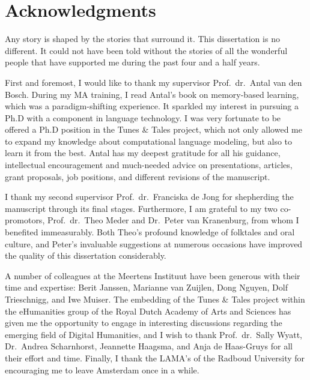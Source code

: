 
\chapter*{Acknowledgments}
  

\noindent Any story is shaped by the stories that surround it. This dissertation is no different. It could not have been told without the stories of all the wonderful people that have supported me during the past four and a half years. 

First and foremost, I would like to thank my supervisor Prof.\ dr.\ Antal van den Bosch. During my MA training, I read Antal's book on memory-based learning, which was a paradigm-shifting experience. It sparkled my interest in pursuing a Ph.D with a component in language technology. I was very fortunate to be offered a Ph.D position in the Tunes \& Tales project, which not only allowed me to expand my knowledge about computational language modeling, but also to learn it from the best. Antal has my deepest gratitude for all his guidance, intellectual encouragement and much-needed advice on presentations, articles, grant proposals, job positions, and different revisions of the manuscript. 

I thank my second supervisor Prof.\ dr.\ Franciska de Jong for shepherding the manuscript through its final stages. Furthermore, I am grateful to my two co-promotors, Prof.\ dr.\ Theo Meder and Dr.\ Peter van Kranenburg, from whom I benefited immeasurably. Both Theo's profound knowledge of folktales and oral culture, and Peter's invaluable suggestions at numerous occasions have improved the quality of this dissertation considerably. 

A number of colleagues at the Meertens Instituut have been generous with their time and expertise: Berit Janssen, Marianne van Zuijlen, Dong Nguyen, Dolf Trieschnigg, and Iwe Muiser. The embedding of the Tunes \& Tales project within the eHumanities group of the Royal Dutch Academy of Arts and Sciences has given me the opportunity to engage in interesting discussions regarding the emerging field of Digital Humanities, and I wish to thank Prof.\ dr.\ Sally Wyatt, Dr.\ Andrea Scharnhorst, Jeannette Haagsma, and Anja de Haas-Gruys for all their effort and time. Finally, I thank the LAMA's of the Radboud University for encouraging me to leave Amsterdam once in a while.

